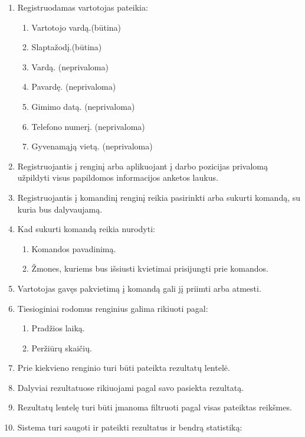 \documentclass{VUMIFPSkursinis}
\begin{document}
\begin{enumerate}[label=\textbf{FR\arabic*}]
\begin{enumerate}[label*=\textbf{.\arabic*}]
					\end{enumerate}
				\item Registruodamas vartotojas pateikia:
					\begin{enumerate}[label*=\textbf{.\arabic*}]
						\item Vartotojo vardą.(būtina)
						\item Slaptažodį.(būtina)
						\item Vardą. (neprivaloma)
						\item Pavardę. (neprivaloma)
						\item Gimimo datą. (neprivaloma)
						\item Telefono numerį. (neprivaloma)
						\item Gyvenamąją vietą. (neprivaloma)
					\end{enumerate}
				\item Registruojantis į renginį arba aplikuojant į darbo pozicijas privalomą užpildyti visus papildomos informacijos anketos laukus.
				\item Registruojantis į komandinį renginį reikia pasirinkti arba sukurti komandą, su kuria bus dalyvaujamą.
				\item Kad sukurti komandą reikia nurodyti:
					\begin{enumerate}[label*=\textbf{.\arabic*}]
						\item Komandos pavadinimą.
						\item Žmones, kuriems bus išsiusti kvietimai prisijungti prie komandos.
					\end{enumerate}
				\item Vartotojas gavęs pakvietimą į komandą gali jį priimti arba atmesti.
				\item Tiesioginiai rodomus renginius galima rikiuoti pagal:
					\begin{enumerate}[label*=\textbf{.\arabic*}]
						\item Pradžios laiką.
						\item Peržiūrų skaičių.
					\end{enumerate}
				\item Prie kiekvieno renginio turi būti pateikta rezultatų lentelė.
				\item Dalyviai rezultatuose rikiuojami pagal savo pasiekta rezultatą.
				\item Rezultatų lentelę turi būti įmanoma filtruoti pagal visas pateiktas reikšmes.
                \item Sistema turi saugoti ir pateikti rezultatus ir bendrą statistiką:
					\begin{enumerate}[label*=\textbf{.\arabic*}]

\end{enumerate}
\end{enumerate}
\end{document}
